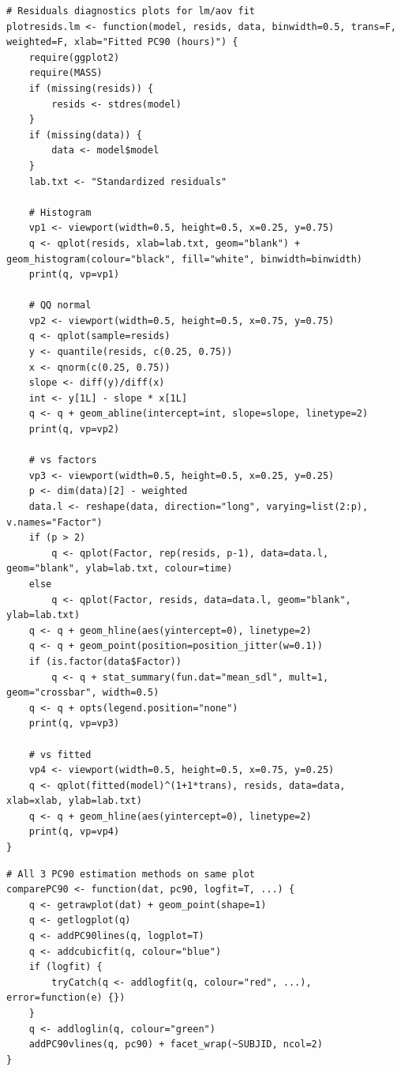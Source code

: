 \begin{singlespace}
\begin{lstlisting}[caption=Residuals diagnostic plots for \texttt{lm,aov} fitted models,label=R:plotresids.lm]
# Residuals diagnostics plots for lm/aov fit
plotresids.lm <- function(model, resids, data, binwidth=0.5, trans=F, weighted=F, xlab="Fitted PC90 (hours)") {
	require(ggplot2)
	require(MASS)
	if (missing(resids)) {
		resids <- stdres(model)
	}
	if (missing(data)) {
		data <- model$model
	}
	lab.txt <- "Standardized residuals"

	# Histogram
	vp1 <- viewport(width=0.5, height=0.5, x=0.25, y=0.75)
	q <- qplot(resids, xlab=lab.txt, geom="blank") + geom_histogram(colour="black", fill="white", binwidth=binwidth) 
	print(q, vp=vp1)

	# QQ normal
	vp2 <- viewport(width=0.5, height=0.5, x=0.75, y=0.75)
	q <- qplot(sample=resids)
	y <- quantile(resids, c(0.25, 0.75))
	x <- qnorm(c(0.25, 0.75))
	slope <- diff(y)/diff(x)
	int <- y[1L] - slope * x[1L]
	q <- q + geom_abline(intercept=int, slope=slope, linetype=2)
	print(q, vp=vp2)

	# vs factors
	vp3 <- viewport(width=0.5, height=0.5, x=0.25, y=0.25)
	p <- dim(data)[2] - weighted
	data.l <- reshape(data, direction="long", varying=list(2:p), v.names="Factor")
	if (p > 2)
		q <- qplot(Factor, rep(resids, p-1), data=data.l, geom="blank", ylab=lab.txt, colour=time)
	else
		q <- qplot(Factor, resids, data=data.l, geom="blank", ylab=lab.txt)
	q <- q + geom_hline(aes(yintercept=0), linetype=2)
	q <- q + geom_point(position=position_jitter(w=0.1))
	if (is.factor(data$Factor))
		q <- q + stat_summary(fun.dat="mean_sdl", mult=1, geom="crossbar", width=0.5)
	q <- q + opts(legend.position="none")
	print(q, vp=vp3)

	# vs fitted
	vp4 <- viewport(width=0.5, height=0.5, x=0.75, y=0.25)
	q <- qplot(fitted(model)^(1+1*trans), resids, data=data, xlab=xlab, ylab=lab.txt)
	q <- q + geom_hline(aes(yintercept=0), linetype=2)
	print(q, vp=vp4)
}
\end{lstlisting}

\begin{lstlisting}[caption=Plot all 3 PC90 methods on same plot,label=R:comparePC90]
# All 3 PC90 estimation methods on same plot
comparePC90 <- function(dat, pc90, logfit=T, ...) {
	q <- getrawplot(dat) + geom_point(shape=1)
	q <- getlogplot(q)
	q <- addPC90lines(q, logplot=T)
	q <- addcubicfit(q, colour="blue")
	if (logfit) {
		tryCatch(q <- addlogfit(q, colour="red", ...), error=function(e) {})
	}
	q <- addloglin(q, colour="green")
	addPC90vlines(q, pc90) + facet_wrap(~SUBJID, ncol=2)
}


\end{lstlisting}
\end{singlespace}

